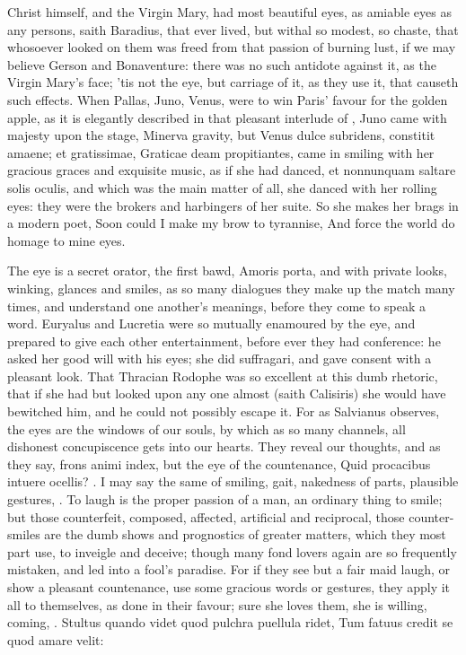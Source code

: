 Christ himself, and the Virgin Mary, had most beautiful eyes, as
amiable eyes as any persons, saith Baradius, that ever lived, but
withal so modest, so chaste, that whosoever looked on them was freed
from that passion of burning lust, if we may believe Gerson and
Bonaventure: there was no such antidote against it, as the Virgin
Mary's face; 'tis not the eye, but carriage of it, as they use it, that
causeth such effects. When Pallas, Juno, Venus, were to win Paris'
favour for the golden apple, as it is elegantly described in that
pleasant interlude of \Apuleius, Juno came with majesty upon the
stage, Minerva gravity, but Venus dulce subridens, constitit amaene; et
gratissimae, Graticae deam propitiantes, \etc{} came in smiling with her
gracious graces and exquisite music, as if she had danced, et
nonnunquam saltare solis oculis, and which was the main matter of all,
she danced with her rolling eyes: they were the brokers and harbingers
of her suite. So she makes her brags in a modern poet,
Soon could I make my brow to tyrannise,
And force the world do homage to mine eyes.

The eye is a secret orator, the first bawd, Amoris porta, and with
private looks, winking, glances and smiles, as so many dialogues they
make up the match many times, and understand one another's meanings,
before they come to speak a word. Euryalus and Lucretia were so
mutually enamoured by the eye, and prepared to give each other
entertainment, before ever they had conference: he asked her good will
with his eyes; she did suffragari, and gave consent with a pleasant
look. That Thracian Rodophe was so excellent at this dumb
rhetoric, that if she had but looked upon any one almost (saith
Calisiris) she would have bewitched him, and he could not possibly
escape it. For as Salvianus observes, the eyes are the windows of
our souls, by which as so many channels, all dishonest concupiscence
gets into our hearts. They reveal our thoughts, and as they say, frons
animi index, but the eye of the countenance, Quid procacibus
intuere ocellis? \etc{}. I may say the same of smiling, gait, nakedness of
parts, plausible gestures, \etc{}. To laugh is the proper passion of a man,
an ordinary thing to smile; but those counterfeit, composed, affected,
artificial and reciprocal, those counter-smiles are the dumb shows and
prognostics of greater matters, which they most part use, to inveigle
and deceive; though many fond lovers again are so frequently mistaken,
and led into a fool's paradise. For if they see but a fair maid laugh,
or show a pleasant countenance, use some gracious words or gestures,
they apply it all to themselves, as done in their favour; sure she
loves them, she is willing, coming, \etc{}.
Stultus quando videt quod pulchra puellula ridet,
Tum fatuus credit se quod amare velit:

